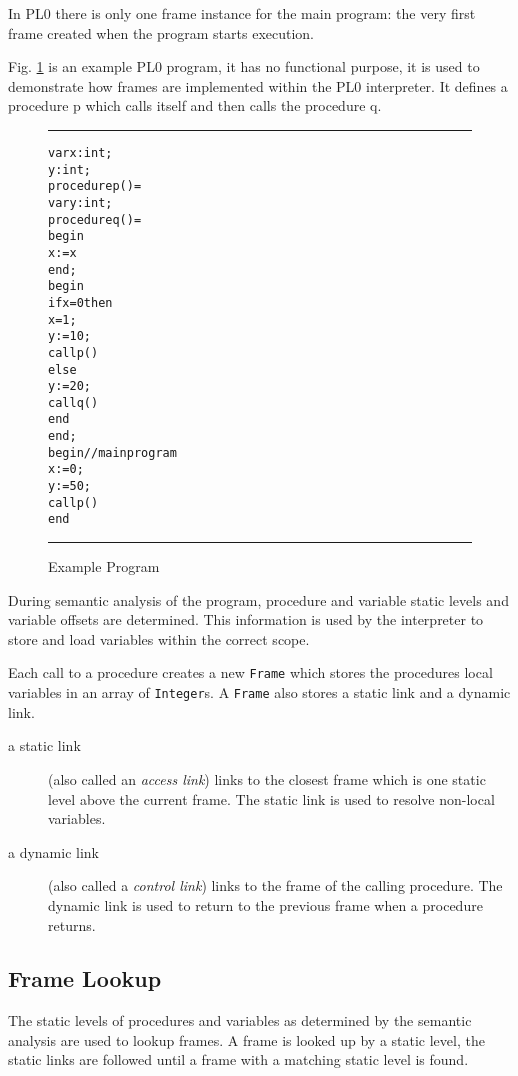 \documentclass[a4paper,twoside,twocolumn]{article}
\begin{document}
In PL0 there is only one frame instance for the main program:
the very first frame created when the program starts execution.

Fig. \ref{figure:exampleprog} is an example PL0 program, it has no functional
purpose, it is used to demonstrate how frames are implemented within the PL0
interpreter. It defines a procedure p which calls itself and then calls the
procedure q.

\begin{figure}[H]
\rule{\columnwidth}{0.5pt}
\begin{alltt}\sf
var x: int;
    y: int;
procedure p() =
  var y: int;
  procedure q() =
    begin
      x := x
    end;
  begin
    if x = 0 then
      x = 1;
      y := 10;
      call p()
    else
      y := 20;
      call q()
    end
  end;
begin // main program
  x := 0;
  y := 50;
  call p()
end
\end{alltt}
\rule{\columnwidth}{0.5pt}
\caption{Example Program}\label{figure:exampleprog}
\end{figure}

During semantic analysis of the program, procedure and variable static levels
and variable offsets are determined.
This information is used by the interpreter to store and load variables within
the correct scope.

Each call to a procedure creates a new \texttt{Frame} which stores the procedures
local variables in an array of \texttt{Integer}s. A \texttt{Frame} also stores
a static link and a dynamic link.

\begin{description}
\item[a static link] (also called an \emph{access link}) links to the closest
frame which is one static level above the current frame. The static link
is used to resolve non-local variables.

\item[a dynamic link] (also called a \emph{control link}) links to the frame
of the calling procedure. The dynamic link is used to return to the previous
frame when a procedure returns.
\end{description}

\subsection{Frame Lookup}\label{section:lookup}
The static levels of procedures and variables as determined by the semantic
analysis are used to lookup frames. A frame is looked up by a static level,
the static links are followed until a frame with a matching static level is
found.
\end{document}
